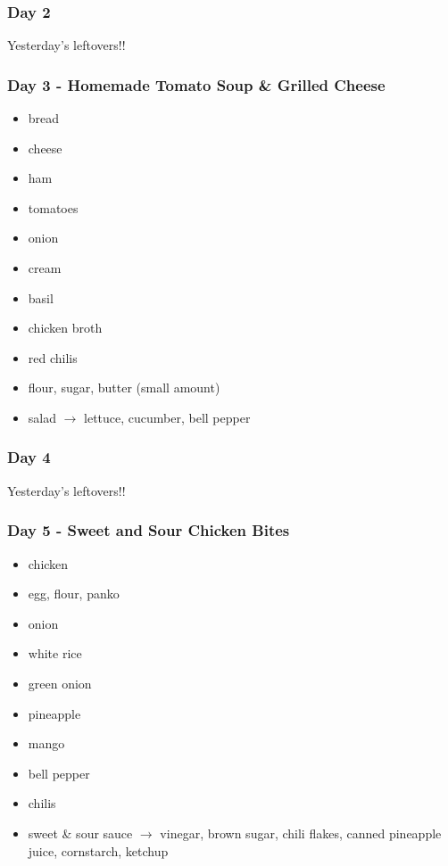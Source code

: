 \documentclass[11pt, a4paper]{article}
\begin{document}
\subsubsection{Day 2}
\vspace{1pc}
Yesterday's leftovers!!



\subsubsection{Day 3 - Homemade Tomato Soup \& Grilled Cheese}
\vspace{1pc}
\begin{itemize}
\item bread
\item cheese
\item ham
\item tomatoes
\item onion 
\item cream 
\item basil 
\item chicken broth 
\item red chilis 
\item flour, sugar, butter (small amount) 
\item salad $\longrightarrow$ lettuce, cucumber, bell pepper 
\end{itemize}



\subsubsection{Day 4}
\vspace{1pc}
Yesterday's leftovers!!

\subsubsection{Day 5 - Sweet and Sour Chicken Bites}
\vspace{1pc}
\begin{itemize}
\item chicken
\item egg, flour, panko
\item onion
\item white rice
\item green onion
\item pineapple 
\item mango 
\item bell pepper 
\item chilis 
\item sweet \& sour sauce $\longrightarrow$ vinegar, brown sugar, chili flakes, canned pineapple juice, cornstarch, ketchup 
\end{itemize}
\end{document}
